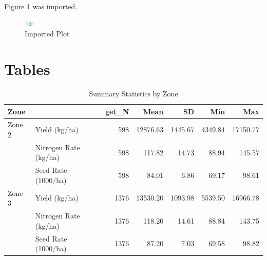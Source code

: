 \documentclass[
]{article}
\begin{document}
Figure \ref{fig:imported-plot} was imported.

\begin{figure}

{\centering \includegraphics[width=0.2in]{g_plot_external} 

}

\caption{Imported Plot}\label{fig:imported-plot}
\end{figure}

\newpage

\hypertarget{tables}{%
\section*{Tables}\label{tables}}

\begin{table}

\caption{\label{tab:summary-statistics}Summary Statistics by Zone}
\centering
\begin{tabular}[t]{llrrrrr}
\toprule
Zone &   & get\_N & Mean & SD & Min & Max\\
\midrule
Zone 2 & Yield (kg/ha) & 598 & \num{12876.63} & \num{1445.67} & \num{4349.84} & \num{17150.77}\\
 & Nitrogen Rate (kg/ha) & 598 & \num{117.82} & \num{14.73} & \num{88.94} & \num{145.57}\\
 & Seed Rate (1000/ha) & 598 & \num{84.01} & \num{6.86} & \num{69.17} & \num{98.61}\\
Zone 3 & Yield (kg/ha) & 1376 & \num{13530.20} & \num{1093.98} & \num{5539.50} & \num{16966.78}\\
 & Nitrogen Rate (kg/ha) & 1376 & \num{118.20} & \num{14.61} & \num{88.84} & \num{143.75}\\
 & Seed Rate (1000/ha) & 1376 & \num{87.20} & \num{7.03} & \num{69.58} & \num{98.82}\\
\bottomrule
\end{tabular}
\end{table}
\end{document}
